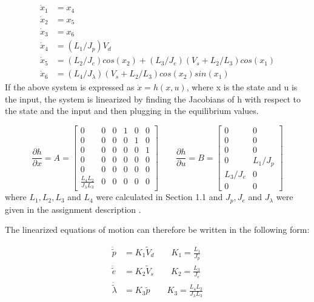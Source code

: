 \begin{subequations}
\label{eq:full state equations}
  \begin{align}
    \dot{x}_1 &= x_4 \\
    \dot{x}_2 &= x_5 \\
    \dot{x}_3 &= x_6 \\
    \dot{x}_4 &= (L_1/J_p) V_d \\
    \dot{x}_5 &= (L_2/J_e)cos(x_2) + (L_3/J_e)(V_s + L_2 / L_3)cos(x_1) \\
    \dot{x}_6 &= (L_4 / J_\lambda) (V_s + L_2 / L_3)cos(x_2)sin(x_1)
  \end{align}
\end{subequations}
If the above system is expressed as $\dot{x} = h(x, u)$, where x is
the state and u is the input, the system is linearized by finding the
Jacobians of h with respect to the state and the input and then
plugging in the equilibrium values.

\begin{equation}
\label{eq:Linearized Jacobians}
  \frac{\partial h}{\partial x} = A =
  \begin{bmatrix}
    0 & 0 & 0 & 1 & 0 & 0 \\
    0 & 0 & 0 & 0 & 1 & 0 \\
    0 & 0 & 0 & 0 & 0 & 1 \\
    0 & 0 & 0 & 0 & 0 & 0 \\
    0 & 0 & 0 & 0 & 0 & 0 \\
    \frac{L_4L_2}{J_\lambda L_3} & 0 & 0 & 0 & 0 & 0
  \end{bmatrix}
  \qquad
  \frac{\partial h}{\partial u} = B =
  \begin{bmatrix}
    0 & 0 \\
    0 & 0 \\
    0 & 0 \\
    0 & L_1/J_p \\
    L_3/J_e & 0 \\
    0 & 0
  \end{bmatrix}
\end{equation}
where $L_1, L_2, L_3$ and $L_4$ were calculated in Section 1.1 and
$J_p, J_e$ and $J_\lambda$ were given in the assignment description
\cite[p.14]{assignment}.


The linearized equations of motion can therefore be written in the
following form:

\begin{subequations}
\label{eq:linearized EoM}
  \begin{align}
    \ddot{\tilde{p}} &= K_1\tilde{V}_d \qquad K_1 = \frac{L_1}{J_p} \label{eq:linearized pitch EoM}\\
    \ddot{\tilde{e}} &= K_2\tilde{V}_s \qquad K_2 = \frac{L_3}{J_e} \label{eq:linearized elevation EoM}\\
    \ddot{\tilde{\lambda}} &= K_3\tilde{p} \qquad K_3 = \frac{L_4L_2}{J_\lambda L_3} \label{eq:linearized travel EoM}
  \end{align}
\end{subequations}
